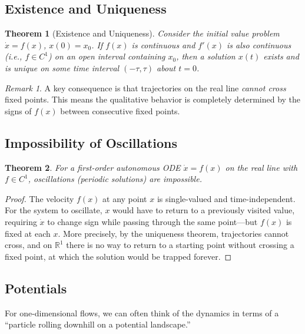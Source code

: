 \documentclass[11pt,letterpaper]{article}
\theoremstyle{definition}
\theoremstyle{plain}
\newtheorem{theorem}{Theorem}[section]
\theoremstyle{remark}
\newtheorem{remark}{Remark}[section]
\newcommand{\R}{\mathbb{R}}
\newcommand{\xdot}{\dot{x}}
\begin{document}
\subsection{Existence and Uniqueness}\label{sec:existence-uniqueness}

\begin{theorem}[Existence and Uniqueness]\label{thm:exist-unique}
Consider the initial value problem $\xdot = f(x)$, $x(0)=x_0$.
If $f(x)$ is continuous and $f'(x)$ is also continuous (i.e.,
$f\in C^1$) on an open interval containing $x_0$, then a solution $x(t)$
exists and is unique on some time interval $(-\tau,\tau)$ about $t=0$.
\end{theorem}

\begin{remark}
A key consequence is that trajectories on the real line \emph{cannot cross}
fixed points.  This means the qualitative behavior is completely determined
by the signs of $f(x)$ between consecutive fixed points.
\end{remark}

\subsection{Impossibility of Oscillations}

\begin{theorem}
For a first-order autonomous ODE $\xdot=f(x)$ on the real line with $f\in C^1$, oscillations (periodic solutions) are impossible.
\end{theorem}
\begin{proof}
The velocity $f(x)$ at any point $x$ is single-valued and time-independent.  For the system to oscillate, $x$ would have to return to a previously visited value, requiring $\xdot$ to change sign while passing through the same point---but $f(x)$ is fixed at each $x$.  More precisely, by the uniqueness theorem, trajectories cannot cross, and on $\R^1$ there is no way to return to a starting point without crossing a fixed point, at which the solution would be trapped forever.
\end{proof}

\subsection{Potentials}

For one-dimensional flows, we can often think of the dynamics in terms of a ``particle rolling downhill on a potential landscape.''
\end{document}
